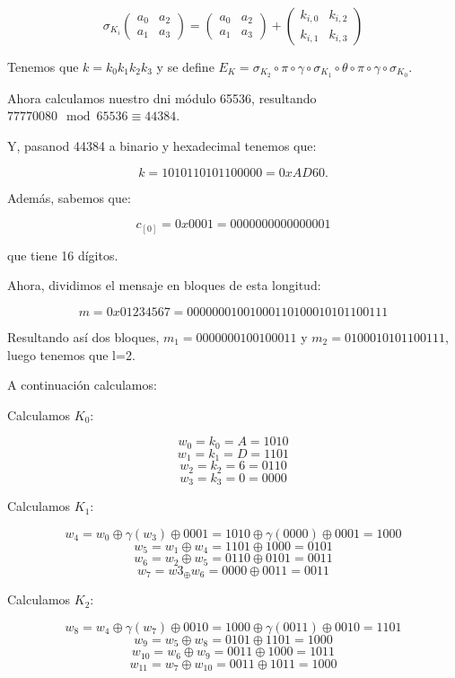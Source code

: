 \documentclass[a4paper]{article}
\begin{document}
$$\sigma_{K_i} \begin{pmatrix} a_0 & a_2 \\ a_1 & a_3 \end{pmatrix} = \begin{pmatrix} a_0 & a_2 \\ a_1 & a_3 \end{pmatrix} + \begin{pmatrix} k_{i,0} & k_{i,2} \\ k_{i,1} & k_{i,3} \end{pmatrix}$$



Tenemos que $k=k_0k_1k_2k_3$ y se define $E_K=\sigma_{K_2} \circ \pi \circ \gamma \circ \sigma_{K_1} \circ \theta \circ \pi \circ \gamma \circ \sigma_{K_0}$.

Ahora calculamos nuestro dni módulo 65536, resultando $77770080\mod 65536\equiv 44384$.

Y, pasanod 44384 a binario y hexadecimal tenemos que:

$$k = 1010110101100000 = 0xAD60.$$

Además, sabemos que:

$$c_{[0]}=0x0001=0000 0000 0000 0001$$

que tiene 16 dígitos.

Ahora, dividimos el mensaje en bloques de esta longitud:

$$m = 0x01234567 = 0000 0001 0010 0011 0100 0101 0110 0111$$

Resultando así dos bloques, $m_1=0000 0001 0010 0011$ y $m_2=0100 0101 0110 0111$, luego tenemos que l=2.

A continuación calculamos:

Calculamos $K_0$:

$$w_0 = k_0 = A = 1010$$
$$w_1 = k_1 = D = 1101$$
$$w_2 = k_2 = 6 = 0110$$
$$w_3 = k_3 = 0 = 0000$$

Calculamos $K_1$:

$$w_4 = w_0 \oplus \gamma (w_3) \oplus 0001 = 1010 \oplus \gamma (0000) \oplus 0001 = 1000$$
$$w_5 = w_1 \oplus w_4 = 1101 \oplus 1000 = 0101$$
$$w_6 = w_2 \oplus w_5 = 0110 \oplus 0101 = 0011$$
$$w_7 = w3_ \oplus w_6 = 0000 \oplus 0011 = 0011$$

Calculamos $K_2$:

$$w_8 = w_4 \oplus \gamma (w_7) \oplus 0010 = 1000 \oplus \gamma (0011) \oplus 0010 = 1101$$
$$w_9 = w_5 \oplus w_8 = 0101 \oplus 1101 = 1000$$
$$w_{10} = w_6 \oplus w_9 = 0011 \oplus 1000 = 1011$$
$$w_{11} = w_7 \oplus w_{10} = 0011 \oplus  1011 = 1000$$
\end{document}

